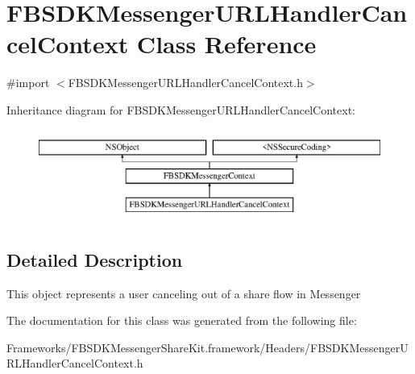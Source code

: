 \hypertarget{interface_f_b_s_d_k_messenger_u_r_l_handler_cancel_context}{}\section{F\+B\+S\+D\+K\+Messenger\+U\+R\+L\+Handler\+Cancel\+Context Class Reference}
\label{interface_f_b_s_d_k_messenger_u_r_l_handler_cancel_context}


{\ttfamily \#import $<$F\+B\+S\+D\+K\+Messenger\+U\+R\+L\+Handler\+Cancel\+Context.\+h$>$}

Inheritance diagram for F\+B\+S\+D\+K\+Messenger\+U\+R\+L\+Handler\+Cancel\+Context\+:\begin{figure}[H]
\begin{center}
\leavevmode
\includegraphics[height=3.000000cm]{interface_f_b_s_d_k_messenger_u_r_l_handler_cancel_context}
\end{center}
\end{figure}


\subsection{Detailed Description}
This object represents a user canceling out of a share flow in Messenger 

The documentation for this class was generated from the following file\+:\begin{DoxyCompactItemize}
\item 
Frameworks/\+F\+B\+S\+D\+K\+Messenger\+Share\+Kit.\+framework/\+Headers/F\+B\+S\+D\+K\+Messenger\+U\+R\+L\+Handler\+Cancel\+Context.\+h\end{DoxyCompactItemize}
